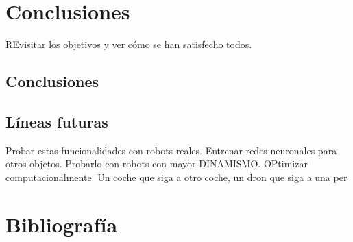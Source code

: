 \documentclass{report}
\begin{document}
\chapter{Conclusiones}
REvisitar los objetivos y ver cómo se han satisfecho todos.
\section{Conclusiones}
\section{Líneas futuras}
Probar estas funcionalidades con robots reales.
Entrenar redes neuronales para otros objetos.
Probarlo con robots con mayor DINAMISMO. OPtimizar computacionalmente. Un coche que siga a otro coche, un dron que siga a una per

\chapter{Bibliografía}
\end{document}
